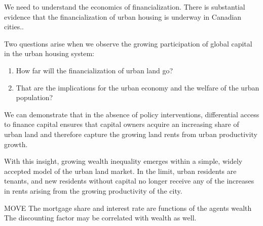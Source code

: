 We need to understand the economics of financialization.
There is substantial evidence that the financialization of urban housing is underway in Canadian cities..

Two questions arise when we observe the growing participation of global capital in the urban housing system: 
\begin{enumerate}
\item How far will the financialization of urban land go? 
\item That are the implications for the urban economy and the welfare of the urban population? 
\end{enumerate}

We can demonstrate that in the absence of policy interventions, differential access to finance capital ensures that capital owners acquire an increasing share of urban land %
and therefore capture the growing land rents from urban productivity growth. 

With this insight, growing wealth inequality emerges within a simple, widely accepted model of the urban land market. In the limit, urban residents are tenants, and new residents without capital no longer receive any of the increases in rents arising from the growing productivity of the city. 



MOVE The mortgage share and interest rate are functions of the agents wealth %
The discounting factor may be correlated with wealth as well. 

